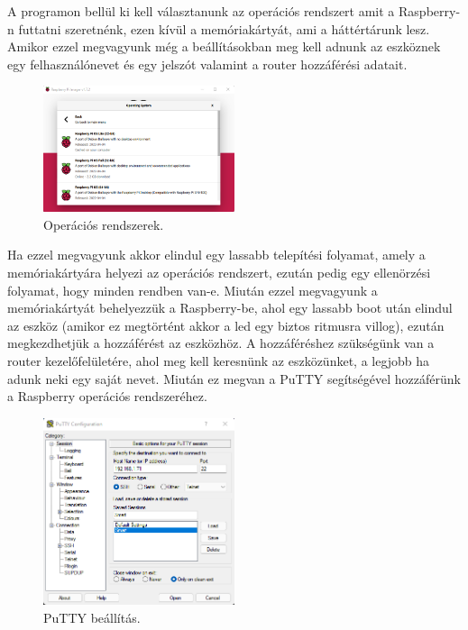\documentclass[a4paper,12pt,oneside]{report}
\begin{document}
A programon bellül ki kell választanunk az operációs rendszert amit a Raspberry-n futtatni szeretnénk, ezen kívül a memóriakártyát, 
ami a háttértárunk lesz. Amikor ezzel megvagyunk még a beállításokban meg kell adnunk az eszköznek egy felhasználónevet és egy jelszót
valamint a router hozzáférési adatait.

\begin{figure}[htbp]
	\centering
	\includegraphics[width=0.5\textwidth]{fig/os.png}
	\caption{Operációs rendszerek.}
	\label{fig-os}
\end{figure}

Ha ezzel megvagyunk akkor elindul egy lassabb telepítési folyamat, amely a memóriakártyára helyezi az operációs rendszert, ezután pedig
egy ellenörzési folyamat, hogy minden rendben van-e.
Miután ezzel megvagyunk a memóriakártyát behelyezzük a Raspberry-be, ahol egy lassabb boot után elindul az eszköz (amikor ez megtörtént
akkor a led egy biztos ritmusra villog), ezután megkezdhetjük a hozzáférést az eszközhöz. 
A hozzáféréshez szükségünk van a router kezelőfelületére, ahol meg kell keresnünk az eszközünket, a legjobb ha adunk neki
egy saját nevet. Miután ez megvan a PuTTY segítségével hozzáférünk a Raspberry operációs rendszeréhez.

\begin{figure}[htbp]
	\centering
	\includegraphics[width=0.5\textwidth]{fig/putty.png}
	\caption{PuTTY beállítás.}
	\label{fig-putty}
\end{figure}
\end{document}
